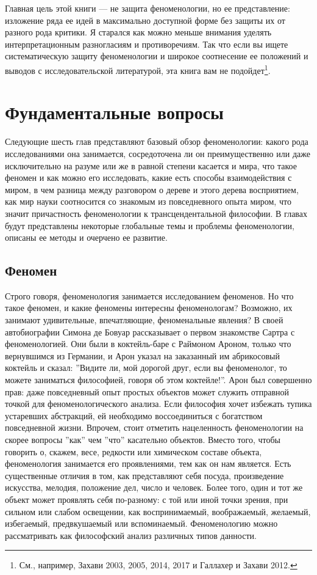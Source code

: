 \documentclass[11pt]{book}
\begin{document}
Главная цель этой книги --- не защита феноменологии, но ее представление: изложение ряда ее идей в максимально доступной форме без защиты их от разного рода критики. Я старался как можно меньше внимания уделять интерпретационным разногласиям и противоречиям. Так что если вы ищете систематическую защиту феноменологии и широкое соотнесение ее положений и выводов с исследовательской литературой, эта книга вам не подойдет\footnote{См., например, Захави 2003, 2005, 2014, 2017 и Галлахер и Захави 2012.}.

\part{Фундаментальные вопросы}

Следующие шесть глав представляют базовый обзор феноменологии: какого рода исследованиями она занимается, сосредоточена ли он преимущественно или даже исключительно на разуме или же в равной степени касается и мира, что такое феномен и как можно его исследовать, какие есть способы взаимодействия с миром, в чем разница между разговором о дереве и этого дерева восприятием, как мир науки соотносится со знакомым из повседневного опыта миром, что значит причастность феноменологии к трансцендентальной философии. В главах будут представлены некоторые глобальные темы и проблемы феноменологии, описаны ее методы и очерчено ее развитие.

\chapter{Феномен}

Строго говоря, феноменология занимается исследованием феноменов. Но что такое феномен, и какие феномены интересны феноменологам? Возможно, их занимают удивительные, впечатляющие, феноменальные явления? В своей автобиографии Симона де Бовуар рассказывает о первом знакомстве Сартра с феноменологией. Они были в коктейль-баре с Раймоном Ароном, только что вернувшимся из Германии, и Арон указал на заказанный им абрикосовый коктейль и сказал: ''Видите ли, мой дорогой друг, если вы феноменолог, то можете заниматься философией, говоря об этом коктейле!''. Арон был совершенно прав: даже повседневный опыт простых объектов может служить отправной точкой для феноменологического анализа. Если философия хочет избежать тупика устаревших абстракций, ей необходимо воссоединиться с богатством повседневной жизни. Впрочем, стоит отметить нацеленность феноменологии на скорее вопросы ''как'' чем ''что'' касательно объектов. Вместо того, чтобы говорить о, скажем, весе, редкости или химическом составе объекта, феноменология занимается его проявлениями, тем как он нам является. Есть существенные отличия в том, как представляют себя посуда, произведение искусства, мелодия, положение дел, число и человек. Более того, один и тот же объект может проявлять себя по-разному: с той или иной точки зрения, при сильном или слабом освещении, как воспринимаемый, воображаемый, желаемый, избегаемый, предвкушаемый или вспоминаемый. Феноменологию можно рассматривать как философский анализ различных типов данности.
\end{document}

